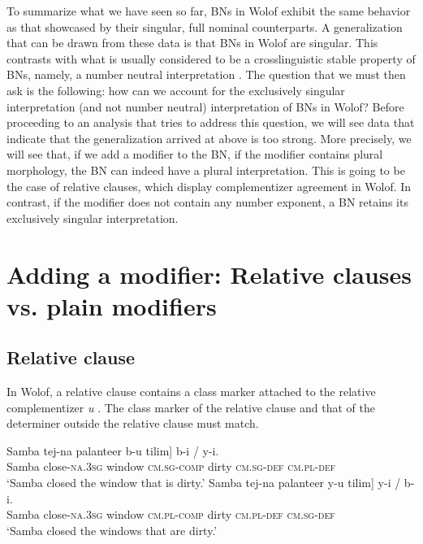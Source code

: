\documentclass[output=paper]{langscibook}
\begin{document}
\noindent To summarize what we have seen so far, BNs in Wolof exhibit the same behavior as that showcased by their singular, full nominal counterparts. A generalization that can be drawn from these data is that BNs in Wolof are singular. This contrasts with what is usually considered to be a crosslinguistic stable property of BNs, namely, a number neutral interpretation \citep{dayal2011hindi}. The question that we must then ask is the following: how can we account for the exclusively singular interpretation (and not number neutral) interpretation of BNs in Wolof? Before proceeding to an analysis that tries to address this question, we will see data that indicate that the generalization arrived at above is too strong. More precisely, we will see that, if we add a modifier to the BN, if the modifier contains plural morphology, the BN can indeed have a plural interpretation. This is going to be the case of relative clauses, which display complementizer agreement in Wolof. In contrast, if the modifier does not contain any number exponent, a BN retains its exclusively singular interpretation.

\section{Adding a modifier: Relative clauses vs. plain modifiers}

\subsection{Relative clause}
\label{fon:sEk:ReLl}

In Wolof, a relative clause contains a class marker \citep{loporcaroBabou16} attached to the relative complementizer \textit{u} \citep{torrence2013clause}. The class marker of the relative clause and that of the determiner outside the relative clause must match.
		
    \ea
		\ea \gll	Samba tej-na palanteer \minsp{[} b-u tilim] b-i /\hspace{30pt} \minsp{*} y-i.\\
				Samba close-\textsc{na.3sg} window {} \textsc{cm.sg-comp} dirty \textsc{cm.sg-def} {} {} \textsc{cm.pl-def}\\
				\glt    `Samba closed the window that is dirty.'\label{fon:kOnkmT2}
		\ex \gll	Samba tej-na palanteer \minsp{[} y-u tilim] y-i /\hspace{35pt} \minsp{*} b-i.\\
				Samba close-\textsc{na.3sg} window {} \textsc{cm.pl-comp} dirty  \textsc{cm.pl-def} {} {} \textsc{cm.sg-def}\\
				\glt    `Samba closed the windows that are dirty.'\label{fon:kOnkmT3}
		\z
	\z
	
\end{document}
